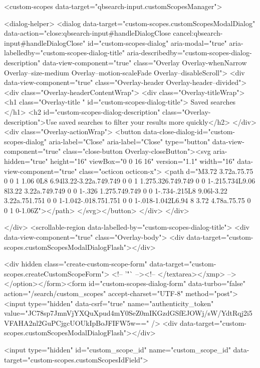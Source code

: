     <custom-scopes data-target="qbsearch-input.customScopesManager">
    
<dialog-helper>
  <dialog data-target="custom-scopes.customScopesModalDialog" data-action="close:qbsearch-input#handleDialogClose cancel:qbsearch-input#handleDialogClose" id="custom-scopes-dialog" aria-modal="true" aria-labelledby="custom-scopes-dialog-title" aria-describedby="custom-scopes-dialog-description" data-view-component="true" class="Overlay Overlay-whenNarrow Overlay--size-medium Overlay--motion-scaleFade Overlay--disableScroll">
    <div data-view-component="true" class="Overlay-header Overlay-header--divided">
  <div class="Overlay-headerContentWrap">
    <div class="Overlay-titleWrap">
      <h1 class="Overlay-title " id="custom-scopes-dialog-title">
        Saved searches
      </h1>
        <h2 id="custom-scopes-dialog-description" class="Overlay-description">Use saved searches to filter your results more quickly</h2>
    </div>
    <div class="Overlay-actionWrap">
      <button data-close-dialog-id="custom-scopes-dialog" aria-label="Close" aria-label="Close" type="button" data-view-component="true" class="close-button Overlay-closeButton"><svg aria-hidden="true" height="16" viewBox="0 0 16 16" version="1.1" width="16" data-view-component="true" class="octicon octicon-x">
    <path d="M3.72 3.72a.75.75 0 0 1 1.06 0L8 6.94l3.22-3.22a.749.749 0 0 1 1.275.326.749.749 0 0 1-.215.734L9.06 8l3.22 3.22a.749.749 0 0 1-.326 1.275.749.749 0 0 1-.734-.215L8 9.06l-3.22 3.22a.751.751 0 0 1-1.042-.018.751.751 0 0 1-.018-1.042L6.94 8 3.72 4.78a.75.75 0 0 1 0-1.06Z"></path>
</svg></button>
    </div>
  </div>
  
</div>
      <scrollable-region data-labelled-by="custom-scopes-dialog-title">
        <div data-view-component="true" class="Overlay-body">        <div data-target="custom-scopes.customScopesModalDialogFlash"></div>

        <div hidden class="create-custom-scope-form" data-target="custom-scopes.createCustomScopeForm">
        <!-- '"` --><!-- </textarea></xmp> --></option></form><form id="custom-scopes-dialog-form" data-turbo="false" action="/search/custom_scopes" accept-charset="UTF-8" method="post"><input type="hidden" data-csrf="true" name="authenticity_token" value="JC78sp7JmnVjYXQuXpud4mY0SeZ0mIKGzdGSfEJOWj/sW/YdtRqj2i5VFAHA2nl2GuPCjgcUOUkIpBoJFIFW5w==" />
          <div data-target="custom-scopes.customScopesModalDialogFlash"></div>

          <input type="hidden" id="custom_scope_id" name="custom_scope_id" data-target="custom-scopes.customScopesIdField">

